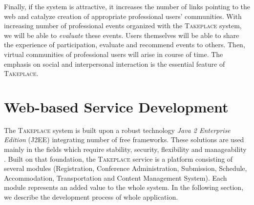 \documentclass[conference]{IEEEtran}
\newcommand\tp{\textsc{Takeplace}\xspace}
\begin{document}

Finally, if the system is attractive, it increases the number of links
pointing to the web and catalyze creation of appropriate professional users'
communities. With increasing number of professional events organized with the
\tp system, we will be able to \emph{evaluate} these events. Users themselves
will be able to share the experience of participation, evaluate and recommend
events to others. Then, virtual communities of professional users will arise
in course of time. The emphasis on social and interpersonal interaction is the
essential feature of \tp.

\section{Web-based Service Development}
The \tp system is built upon a robust technology \emph{Java 2 Enterprise
Edition} (J2EE) integrating number of free frameworks. These solutions are used
mainly in the fields which require stability, security, flexibility and
manageability \cite{racek2006is}. Built on that foundation, the \tp service is
a platform consisting of several modules (Registration, Conference
Administration, Submission, Schedule, Accommodation, Transportation and
Content Management System). Each module represents an added value to the whole
system. In the following section, we describe the development process of whole
application.
\end{document}
